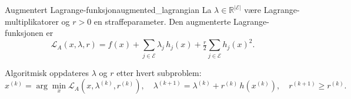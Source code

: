\begin{definition}{Augmentert Lagrange-funksjon}{augmented_lagrangian}
    La \(\lambda\in\mathbb R^{|\mathcal E|}\) være Lagrange-multiplikatorer og \(r>0\) en straffeparameter. Den augmenterte Lagrange-funksjonen er
    \[
        \mathcal L_A(x,\lambda,r)
        = f(x)
        + \sum_{j\in\mathcal E}\lambda_j\,h_j(x)
        + \tfrac r2\sum_{j\in\mathcal E} h_j(x)^2.
    \]
\end{definition}

Algoritmisk oppdateres \(\lambda\) og \(r\) etter hvert subproblem:
\[
    x^{(k)} = \arg\min_x \mathcal L_A(x,\lambda^{(k)},r^{(k)}),
    \quad
    \lambda^{(k+1)} = \lambda^{(k)} + r^{(k)}\,h(x^{(k)}),
    \quad
    r^{(k+1)} \ge r^{(k)}.
\]
